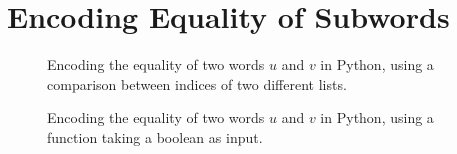 \clearpage
\section{Encoding Equality of Subwords}

\begin{figure}
    \centering
\begin{Shaded}
\begin{Highlighting}[]
     
         
            \OperatorTok{==}\OperatorTok{!=}
                 
     
\end{Highlighting}
\end{Shaded}
\caption{Encoding the equality of two words $u$ and $v$ in Python,
using a comparison between indices of two different lists.}
\label{fig:eq-def-different-indices}
\end{figure}

\begin{figure}
    \centering
\begin{Shaded}
\begin{Highlighting}[]
    \NormalTok{:}

\OperatorTok{=} 
     
\OperatorTok{=} 
         
            \OperatorTok{==}\OperatorTok{!=}
                 
     
\end{Highlighting}
\end{Shaded}
\caption{Encoding the equality of two words $u$ and $v$ in Python,
using a function taking a boolean as input.}
\label{fig:eq-def-boolean}
\end{figure}

